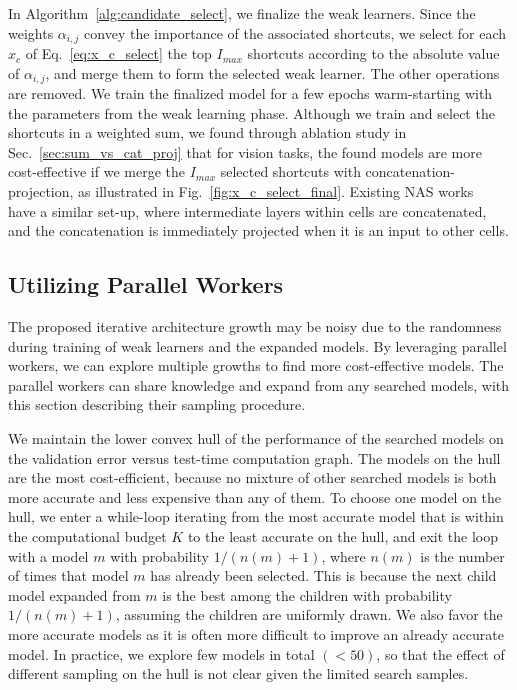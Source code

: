 In Algorithm~\ref{alg:candidate_select}, we finalize the weak learners. Since the weights $\alpha_{i,j}$ convey the importance of the associated shortcuts, we select for each $x_c$ of Eq.~\ref{eq:x_c_select} the top $I_{max}$ shortcuts according to the absolute value of $\alpha_{i,j}$, and merge them to form the selected weak learner. The other operations are removed. 
We train the finalized model for a few epochs warm-starting with the parameters from the weak learning phase. 
Although we train and select the shortcuts in a weighted sum, we found through ablation study in Sec.~\ref{sec:sum_vs_cat_proj} that for vision tasks, the found models are more cost-effective if we merge the $I_{max}$ selected shortcuts with concatenation-projection, as illustrated in Fig.~\ref{fig:x_c_select_final}. Existing NAS works~\citep{NASCell,Real2018RegularizedEF,Pham2018EfficientNA,Liu2018DARTSDA} have a similar set-up, where intermediate layers within cells are concatenated, and the concatenation is immediately projected when it is an input to other cells. 

\subsection{Utilizing Parallel Workers}
\label{sec:parent_choice}

The proposed iterative architecture growth may be noisy 
due to the randomness during training of weak learners and 
the expanded models. By leveraging parallel workers, we 
can explore multiple growths to find more cost-effective models. 
The parallel workers can share knowledge and expand from any searched models, 
with this section describing their sampling procedure.

We maintain the lower convex hull of the performance of the 
searched models on the validation error versus test-time computation 
graph. The models on the hull are the most cost-efficient, 
because no mixture of other searched models is both more accurate and less expensive
than any of them. To choose one model on the hull, we enter a while-loop
iterating from the most accurate model that is within the computational  
budget $K$ to the least accurate on the hull, 
and exit the loop with a model $m$ with probability $1/(n(m) + 1)$, 
where $n(m)$ is the number of times that model $m$ has already been selected. 
This is because the next child model expanded from $m$ is the best among the children with probability
$1/(n(m) + 1)$, assuming the children are uniformly drawn. 
We also favor the more accurate models as it is often more difficult to 
improve an already accurate model. In practice, we explore few 
models in total $(<50)$, so that the effect of different sampling on the hull 
is not clear given the limited search samples. 


